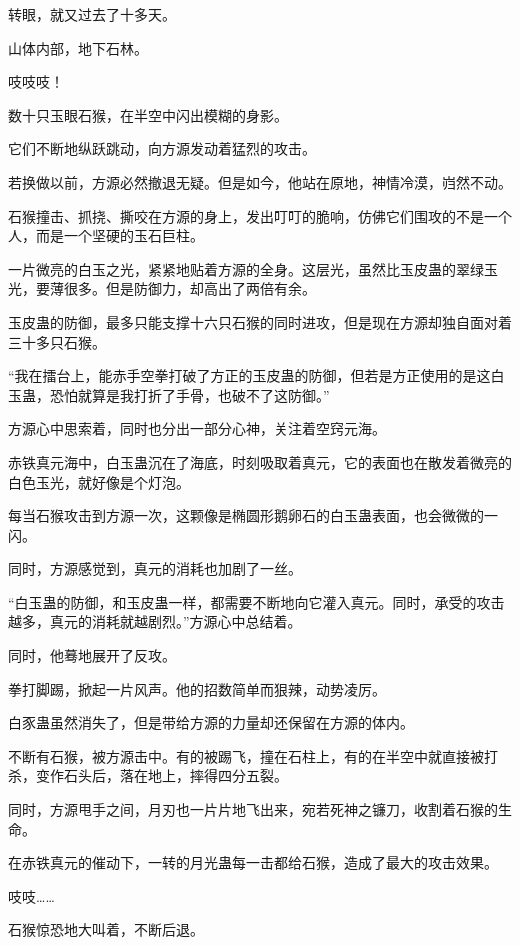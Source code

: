 
\begin{this_body}

转眼，就又过去了十多天。

山体内部，地下石林。

吱吱吱！

数十只玉眼石猴，在半空中闪出模糊的身影。

它们不断地纵跃跳动，向方源发动着猛烈的攻击。

若换做以前，方源必然撤退无疑。但是如今，他站在原地，神情冷漠，岿然不动。

石猴撞击、抓挠、撕咬在方源的身上，发出叮叮的脆响，仿佛它们围攻的不是一个人，而是一个坚硬的玉石巨柱。

一片微亮的白玉之光，紧紧地贴着方源的全身。这层光，虽然比玉皮蛊的翠绿玉光，要薄很多。但是防御力，却高出了两倍有余。

玉皮蛊的防御，最多只能支撑十六只石猴的同时进攻，但是现在方源却独自面对着三十多只石猴。

“我在擂台上，能赤手空拳打破了方正的玉皮蛊的防御，但若是方正使用的是这白玉蛊，恐怕就算是我打折了手骨，也破不了这防御。”

方源心中思索着，同时也分出一部分心神，关注着空窍元海。

赤铁真元海中，白玉蛊沉在了海底，时刻吸取着真元，它的表面也在散发着微亮的白色玉光，就好像是个灯泡。

每当石猴攻击到方源一次，这颗像是椭圆形鹅卵石的白玉蛊表面，也会微微的一闪。

同时，方源感觉到，真元的消耗也加剧了一丝。

“白玉蛊的防御，和玉皮蛊一样，都需要不断地向它灌入真元。同时，承受的攻击越多，真元的消耗就越剧烈。”方源心中总结着。

同时，他蓦地展开了反攻。

拳打脚踢，掀起一片风声。他的招数简单而狠辣，动势凌厉。

白豕蛊虽然消失了，但是带给方源的力量却还保留在方源的体内。

不断有石猴，被方源击中。有的被踢飞，撞在石柱上，有的在半空中就直接被打杀，变作石头后，落在地上，摔得四分五裂。

同时，方源甩手之间，月刃也一片片地飞出来，宛若死神之镰刀，收割着石猴的生命。

在赤铁真元的催动下，一转的月光蛊每一击都给石猴，造成了最大的攻击效果。

吱吱……

石猴惊恐地大叫着，不断后退。


\end{this_body}
